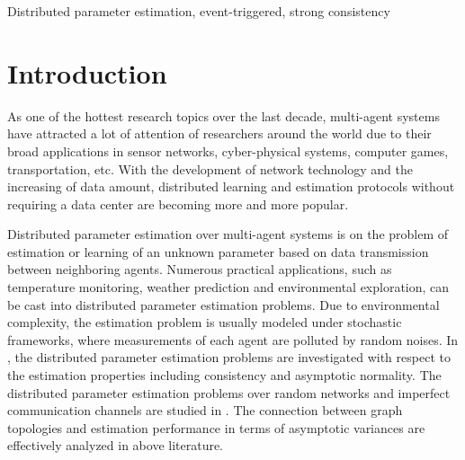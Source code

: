\documentclass[10pt,journal,final]{IEEEtran}
\theoremstyle{plain}
\theoremstyle{definition}
\theoremstyle{remark}
\begin{document}
\begin{IEEEkeywords}
Distributed parameter estimation, event-triggered, strong consistency
\end{IEEEkeywords}


\section{Introduction}
As one of the hottest research topics over the last decade, multi-agent systems have attracted a  lot of attention of researchers around the world due to their broad applications in sensor networks, cyber-physical systems, computer games, transportation, etc. With the development of network technology and the increasing of data amount, distributed learning and estimation protocols without requiring a data center are becoming more and more popular. 


Distributed parameter estimation over multi-agent systems is on the problem of  estimation or learning of an unknown parameter based on  data transmission between neighboring agents. Numerous practical applications, such as temperature monitoring, weather prediction and environmental exploration, can be cast into distributed parameter estimation problems. Due to   environmental complexity, the estimation problem is usually modeled under  stochastic frameworks, where  measurements of each agent are polluted by random noises. In \cite{rad2010distributed,kar2011convergence,kar2013distributed,cattivelli2010diffusion}, the distributed parameter estimation problems are investigated with respect to the estimation properties including consistency and asymptotic normality.
The distributed parameter estimation problems over random networks and imperfect communication channels are studied in  \cite{zhang2012distributed,kar2012distributed}. The connection between  graph topologies and  estimation performance in terms of asymptotic variances are  effectively analyzed in above literature.
\end{document}
